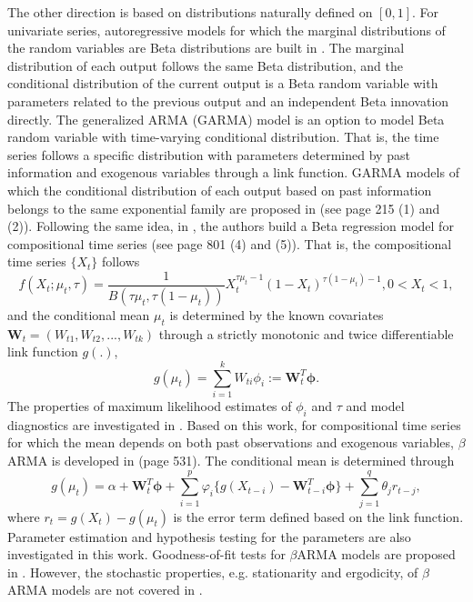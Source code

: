 \documentclass{article}
\theoremstyle{definition}
\begin{document}
The other direction is based on distributions naturally defined on $[0,1]$. For univariate series, autoregressive models for which the marginal distributions of the random variables are Beta distributions are built in \cite{mckenzie1985autoregressive}. The marginal distribution of each output follows the same Beta distribution, and the conditional distribution of the current output is a Beta random variable with parameters related to the previous output and an independent Beta innovation directly. The generalized ARMA (GARMA) model is an option to model Beta random variable with time-varying conditional distribution. That is, the time series follows a specific distribution with parameters determined by past information and exogenous variables through a link function. GARMA models of which the conditional distribution of each output based on past information belongs to the same exponential family are proposed in \cite{benjamin2003generalized} (see page 215 (1) and (2)). Following the same idea, in \cite{ferrari2004beta}, the authors build a Beta regression model for compositional time series (see page 801 (4) and (5)). That is, the compositional time series $\{X_t\}$ follows
\begin{equation*}
    f(X_t;\mu_t, \tau) = \frac{1}{B(\tau \mu_t, \tau (1-\mu_t))}X_t^{\tau \mu_t-1}(1-X_t)^{\tau(1-\mu_t)-1}, 0<X_t<1,
\end{equation*}
and the conditional mean $\mu_t$ is determined by the known covariates $\bm{W}_t = (W_{t1}, W_{t2}, ..., W_{tk})$ through a strictly monotonic and twice differentiable link function $g(.)$,
\begin{equation*}
    g(\mu_t) = \sum_{i=1}^k W_{ti}\phi_i := \bm{W}_t^T \bm{\phi}. 
\end{equation*}
The properties of maximum likelihood estimates of $\phi_i$ and $\tau$ and model diagnostics are investigated in \cite{ferrari2004beta}. Based on this work, for compositional time series for which the mean depends on both past observations and exogenous variables, $\beta$ARMA is developed in \cite{rocha2009beta} (page 531). The conditional mean is determined through
\begin{equation*}
    g(\mu_t) = \alpha+\bm{W}_t^T \bm{\phi}+\sum_{i=1}^p \varphi_i\{g(X_{t-i})-\bm{W}_{t-i}^T \bm{\phi}\} + \sum_{j=1}^q \theta_j r_{t-j},
\end{equation*}
where $r_t = g(X_t)-g(\mu_t)$ is the error term defined based on the link function.
Parameter estimation and hypothesis testing for the parameters are also investigated in this work. Goodness-of-fit tests for $\beta$ARMA models are proposed in \cite{scher2020goodness}. However, the stochastic properties, e.g. stationarity and ergodicity, of $\beta$ARMA models are not covered in \cite{scher2020goodness}.
\end{document}
